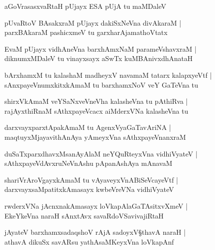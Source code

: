 \begin{shloka}
aGoVrasasxvaRtaH pUjayx ESA pUjA tu maMDaleV 
\end{shloka}

\begin{shloka}
pUvaRtoV BAsakxraM pUjayx dakiSxNeVna divAkaraM |\\
parxBAkaraM pashicxmeV tu garxharAjamathoVtatx
\end{shloka}

\begin{shloka}
EvaM pUjayx vidhAneVna barxhAmxNaM parameVshavxraM |\\
diknumxMDaleV tu vinayxsayx aSwTx kuMBAnivxdhAnataH 
\end{shloka}

\begin{shloka}
bArxhamxM tu kalashaM madheyxV navamaM tatarx kalapxyeVtf |\\
sAnxpayeVnumxkitxkAmaM tu barxhamxNoV veY GaTeVna tu 
\end{shloka}

\begin{shloka}
shirxVkAmaM veYSaNxveVneVha kalasheVna tu pAthiRva |\\
rajAyxthiRnaM sAthxpayeVcacx aiMderxVNa kalasheVna tu
\end{shloka}

\begin{shloka}
darxvayxparxtApakAmaM tu AgenxVyaGaTavAriNA |\\
maqtuyxMjayavithAnAya yAmeyxVna sAthxpayeVnanxraM 
\end{shloka}

\begin{shloka}
duSaTxparxdhavxMsanAyAlaM neYQuRteyxVna vidhiVyateV |\\
sAthxpayeVdAvxruNeVnAshu pApanAshAya mAnavaM 
\end{shloka}

\begin{shloka}
shariVrAroVgayxkAmaM tu vAyaveyxVnABiSeVcayeVtf |\\
darxvayxsaMpatitxkAmasayx kwbeVreVNa vidhiVyateV 
\end{shloka}

\begin{shloka}
rwderxVNa jAcnxnakAmasayx loVkapAlaGaTAsitxvXmeV |\\
EkeYkeVna naraH sAnxtAvx savaRdoVSavivajiRtaH
\end{shloka}

\begin{shloka}
jAyateV barxhamxsadaqshoV rAjA sadoyxV\S thavA naraH |\\
athavA dikuSx savARsu yathAsaMKeyxVna loVkapAnf 
\end{shloka}

